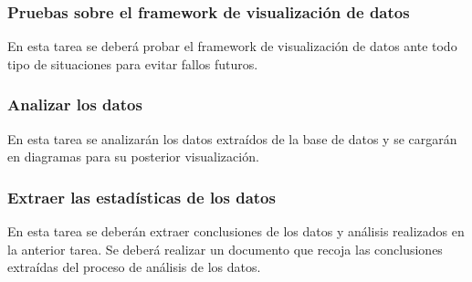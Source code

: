 \subsubsection{Pruebas sobre el framework de visualización de datos}
En esta tarea se deberá probar el framework de visualización de datos ante todo tipo de situaciones para evitar fallos futuros.

\subsubsection{Analizar los datos}
En esta tarea se analizarán los datos extraídos de la base de datos y se cargarán en diagramas para su posterior visualización.

\subsubsection{Extraer las estadísticas de los datos}
En esta tarea se deberán extraer conclusiones de los datos y análisis realizados en la anterior tarea. Se deberá realizar un documento que recoja las conclusiones extraídas del proceso de análisis de los datos.

